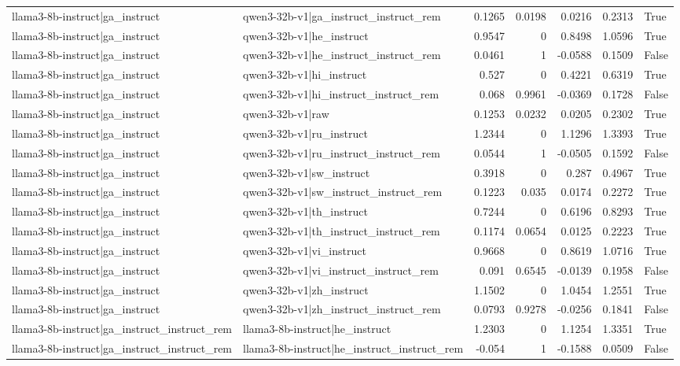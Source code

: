 \begin{table}
\begin{tabular}{l l r r r r l}
llama3-8b-instruct|ga_instruct & qwen3-32b-v1|ga_instruct_instruct_rem & 0.1265 & 0.0198 & 0.0216 & 0.2313 & True \\
llama3-8b-instruct|ga_instruct & qwen3-32b-v1|he_instruct & 0.9547 & 0 & 0.8498 & 1.0596 & True \\
llama3-8b-instruct|ga_instruct & qwen3-32b-v1|he_instruct_instruct_rem & 0.0461 & 1 & -0.0588 & 0.1509 & False \\
llama3-8b-instruct|ga_instruct & qwen3-32b-v1|hi_instruct & 0.527 & 0 & 0.4221 & 0.6319 & True \\
llama3-8b-instruct|ga_instruct & qwen3-32b-v1|hi_instruct_instruct_rem & 0.068 & 0.9961 & -0.0369 & 0.1728 & False \\
llama3-8b-instruct|ga_instruct & qwen3-32b-v1|raw & 0.1253 & 0.0232 & 0.0205 & 0.2302 & True \\
llama3-8b-instruct|ga_instruct & qwen3-32b-v1|ru_instruct & 1.2344 & 0 & 1.1296 & 1.3393 & True \\
llama3-8b-instruct|ga_instruct & qwen3-32b-v1|ru_instruct_instruct_rem & 0.0544 & 1 & -0.0505 & 0.1592 & False \\
llama3-8b-instruct|ga_instruct & qwen3-32b-v1|sw_instruct & 0.3918 & 0 & 0.287 & 0.4967 & True \\
llama3-8b-instruct|ga_instruct & qwen3-32b-v1|sw_instruct_instruct_rem & 0.1223 & 0.035 & 0.0174 & 0.2272 & True \\
llama3-8b-instruct|ga_instruct & qwen3-32b-v1|th_instruct & 0.7244 & 0 & 0.6196 & 0.8293 & True \\
llama3-8b-instruct|ga_instruct & qwen3-32b-v1|th_instruct_instruct_rem & 0.1174 & 0.0654 & 0.0125 & 0.2223 & True \\
llama3-8b-instruct|ga_instruct & qwen3-32b-v1|vi_instruct & 0.9668 & 0 & 0.8619 & 1.0716 & True \\
llama3-8b-instruct|ga_instruct & qwen3-32b-v1|vi_instruct_instruct_rem & 0.091 & 0.6545 & -0.0139 & 0.1958 & False \\
llama3-8b-instruct|ga_instruct & qwen3-32b-v1|zh_instruct & 1.1502 & 0 & 1.0454 & 1.2551 & True \\
llama3-8b-instruct|ga_instruct & qwen3-32b-v1|zh_instruct_instruct_rem & 0.0793 & 0.9278 & -0.0256 & 0.1841 & False \\
llama3-8b-instruct|ga_instruct_instruct_rem & llama3-8b-instruct|he_instruct & 1.2303 & 0 & 1.1254 & 1.3351 & True \\
llama3-8b-instruct|ga_instruct_instruct_rem & llama3-8b-instruct|he_instruct_instruct_rem & -0.054 & 1 & -0.1588 & 0.0509 & False \\

\end{tabular}
\end{table}
